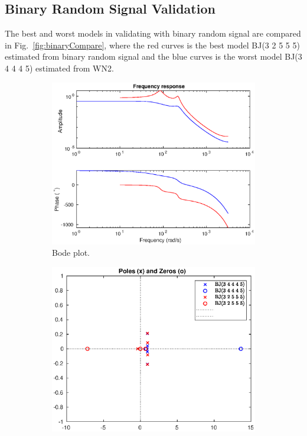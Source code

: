 \documentclass[10pt,a4paper]{article}
\begin{document}
\subsection{Binary Random Signal Validation}
\par The best and worst models in validating with binary random signal are compared in Fig.~\ref{fig:binaryCompare}, where the red curves is the best model BJ(3 2 5 5 5) estimated from binary random signal and the blue curves is the worst model BJ(3 4 4 4 5) estimated from WN2.
	\begin{figure}[ht]
		\footnotesize
		\centering
		\begin{subfigure}[t]{.32\linewidth}
		\centering\includegraphics[width=\linewidth]{binaryFrequencyResponse.eps}
		\caption{Bode plot.}
		\end{subfigure}
		\begin{subfigure}[t]{.32\linewidth}
		\centering\includegraphics[width=\linewidth]{binaryPolesZeros.eps}

\end{subfigure}
\end{figure}
\end{document}
